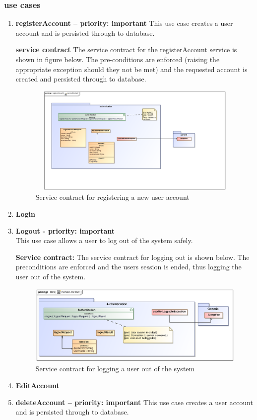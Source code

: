 \documentclass[12pt]{article}
\begin{document}
\subsubsection{use cases}

\begin{enumerate}


\item \textbf{registerAccount  – priority: important } 
This use case creates  a user account and is persisted through to database.

\par{\textbf{service contract} The service contract for the registerAccount  service is shown in figure below. The pre-conditions are enforced (raising the appropriate exception should they not be met) and the requested account is created and persisted through to database.}
\begin{figure}[h]
		\includegraphics[height=200px, width=500px]{epsImages/Authentication/serviceContract.eps}
		\caption{Service contract for registering a new user account}
\end{figure}
\item \textbf{Login}
\item \textbf{Logout - priority: important} \\
This use case allows a user to log out of the system safely.

\par{\textbf{Service contract:} The service contract for logging out is shown below. The preconditions are enforced and the users session is ended, thus logging the user out of the system.}
\begin{figure}[h]

\includegraphics[scale=.9]{epsImages/Authentication/logoutServiceContract.eps}
\caption{Service contract for logging a user out of the system}
\end{figure}
\item \textbf{EditAccount}
\item \textbf{deleteAccount  – priority: important} 
This use case creates  a user account and is persisted through to database.


\end{enumerate}
\end{document}
